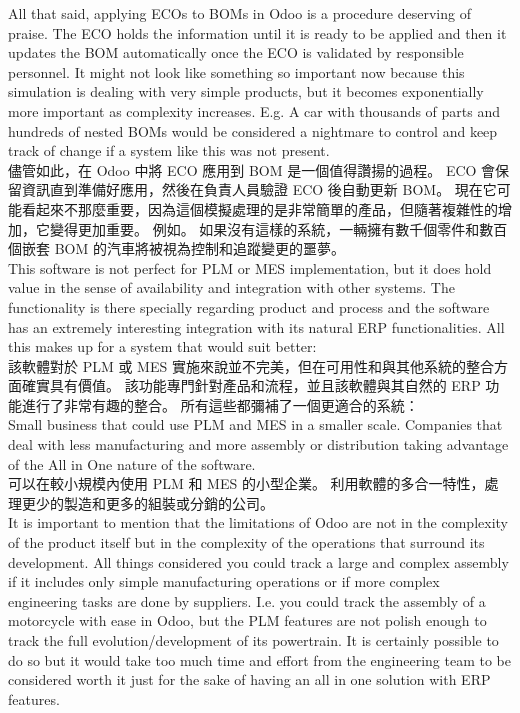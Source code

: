 \fontsize{12pt}{2.5pt}\selectfont 
{All that said, applying ECOs to BOMs in Odoo is a procedure deserving of praise. The ECO holds the information until it is ready to be applied and then it updates the BOM automatically once the ECO is validated by responsible personnel. It might not look like something so important now because this simulation is dealing with very simple products, but it becomes exponentially more important as complexity increases. E.g. A car with thousands of parts and hundreds of nested BOMs would be considered a nightmare to control and keep track of change if a system like this was not present.}\\[1pt]

\fontsize{12pt}{2.5pt}\selectfont
{儘管如此，在 Odoo 中將 ECO 應用到 BOM 是一個值得讚揚的過程。 ECO 會保留資訊直到準備好應用，然後在負責人員驗證 ECO 後自動更新 BOM。 現在它可能看起來不那麼重要，因為這個模擬處理的是非常簡單的產品，但隨著複雜性的增加，它變得更加重要。 例如。 如果沒有這樣的系統，一輛擁有數千個零件和數百個嵌套 BOM 的汽車將被視為控制和追蹤變更的噩夢。}\\[1pt]

\fontsize{12pt}{2.5pt}\selectfont 
{This software is not perfect for PLM or MES implementation, but it does hold value in the sense of availability and integration with other systems. The functionality is there specially regarding product and process and the software has an extremely interesting integration with its natural ERP functionalities. All this makes up for a system that would suit better:}\\[1pt]

\fontsize{12pt}{2.5pt}\selectfont
{該軟體對於 PLM 或 MES 實施來說並不完美，但在可用性和與其他系統的整合方面確實具有價值。 該功能專門針對產品和流程，並且該軟體與其自然的 ERP 功能進行了非常有趣的整合。 所有這些都彌補了一個更適合的系統：}\\[1pt]

\fontsize{12pt}{2.5pt}\selectfont 
{Small business that could use PLM and MES in a smaller scale.
Companies that deal with less manufacturing and more assembly or distribution taking advantage of the All in One nature of the software.}\\[1pt]

\fontsize{12pt}{2.5pt}\selectfont
{可以在較小規模內使用 PLM 和 MES 的小型企業。
利用軟體的多合一特性，處理更少的製造和更多的組裝或分銷的公司。}\\[1pt]

\fontsize{12pt}{2.5pt}\selectfont 
{It is important to mention that the limitations of Odoo are not in the complexity of the product itself but in the complexity of the operations that surround its development. All things considered you could track a large and complex assembly if it includes only simple manufacturing operations or if more complex engineering tasks are done by suppliers. I.e. you could track the assembly of a motorcycle with ease in Odoo, but the PLM features are not polish enough to track the full evolution/development of its powertrain. It is certainly possible to do so but it would take too much time and effort from the engineering team to be considered worth it just for the sake of having an all in one solution with ERP features.}\\[1pt]


